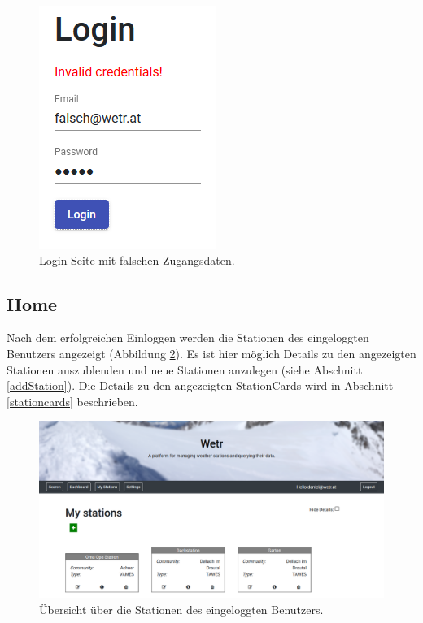 \documentclass[12pt, letterpaper]{article}
\begin{document}
\begin{figure}[H]
    \centering
    \includegraphics[scale=1.0]{img/login/invalid.png}
    \caption{Login-Seite mit falschen Zugangsdaten.}
    \label{fig:invalid_login}
\end{figure}


\subsection{Home}

Nach dem erfolgreichen Einloggen werden die Stationen des eingeloggten Benutzers angezeigt (Abbildung \ref{fig:myStations}). Es ist hier möglich Details zu den angezeigten Stationen auszublenden und neue Stationen anzulegen (siehe Abschnitt \ref{addStation}). Die Details zu den angezeigten StationCards wird in Abschnitt \ref{stationcards} beschrieben.

\begin{figure}[H]
    \centering
    \includegraphics[width=\textwidth]{img/stations/mystations.png}
    \caption{Übersicht über die Stationen des eingeloggten Benutzers.}
    \label{fig:myStations}
\end{figure}
\end{document}
